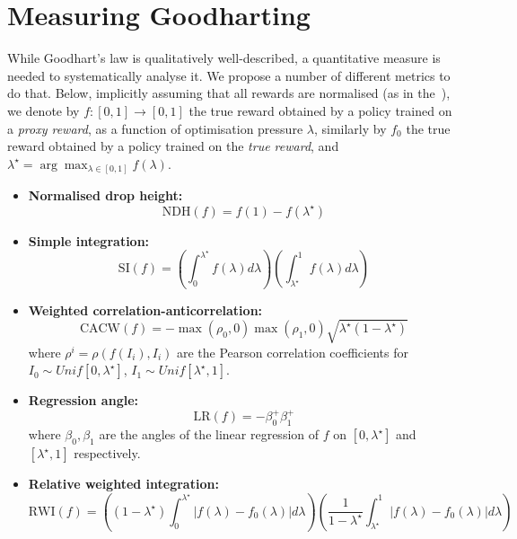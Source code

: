 \section{Measuring Goodharting}\label{appendix:measuring_goodharting}

While Goodhart’s law is qualitatively well-described, a quantitative measure is needed to systematically analyse it. We propose a number of different metrics to do that. Below, implicitly assuming that all rewards are normalised (as in the~), we denote by $f: [0, 1] \to [0, 1]$ the true reward obtained by a policy trained on a \emph{proxy reward}, as a function of optimisation pressure $\lambda$, similarly by $f_0$ the true reward obtained by a policy trained on the \emph{true reward}, and $\lambda^\star = \arg\max_{\lambda \in [0, 1]} f(\lambda)$.

\begin{itemize}
    \item \textbf{Normalised drop height:} 
    \[
        \text{NDH}(f) = f(1) - f(\lambda^\star)
    \]
    \item \textbf{Simple integration:} 
    \[
        \text{SI}(f) = \left( \int_{0}^{\lambda^\star} f(\lambda) d\lambda \right) \left( \int_{\lambda^\star}^1 f(\lambda) d\lambda \right)
    \]
    \item \textbf{Weighted correlation-anticorrelation:} 
    \[
    \text{CACW}(f) = -\max(\rho_0, 0) \max(\rho_1, 0) \sqrt{\lambda^\star (1- \lambda^\star)}
    \]
    where $\rho^i = \rho(f(I_i), I_i)$ are the Pearson correlation coefficients for $I_0 \sim Unif[0, \lambda^\star]$, $I_1 \sim Unif[\lambda^\star, 1]$.
    \item \textbf{Regression angle:} 
    \[
        \text{LR}(f) = -\beta_0^+ \beta_1^+
    \] where $\beta_0, \beta_1$ are the angles of the linear regression of $f$ on $[0, \lambda^\star]$ and $[\lambda^\star, 1]$ respectively.
    \item \textbf{Relative weighted integration:} \[
        \text{RWI}(f) = \left((1 - \lambda^\star) \int_{0}^{\lambda^\star} |f(\lambda) - f_0(\lambda)| d\lambda \right) \left(\frac{1}{1 - \lambda^\star} \int_{\lambda^\star}^1 |f(\lambda) - f_0(\lambda)| d\lambda \right) 
        \]
\end{itemize}

